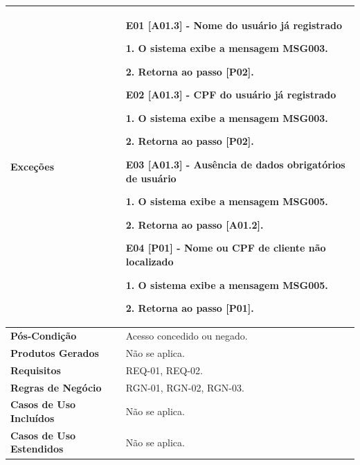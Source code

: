 \newpage
\begin{quadro}[!htbp]
	\begin{tabular}{  m{4cm}  m{11cm} }  	
        \cellcolor{gray!10}\textbf {Exceções}            & \cellcolor{gray!10}\textbf {E01 [A01.3] - Nome do usuário já registrado}
        
        1. O sistema exibe a mensagem MSG003.
        
        2. Retorna ao passo [P02].
        
        \textbf {E02 [A01.3] - CPF do usuário já registrado}
        
        1. O sistema exibe a mensagem MSG003.
        
        2. Retorna ao passo [P02].
        
        \textbf {E03 [A01.3] - Ausência de dados obrigatórios de usuário}
        
        1. O sistema exibe a mensagem MSG005.
        
        2. Retorna ao passo [A01.2].
        
        \textbf {E04 [P01] - Nome ou CPF de cliente não localizado}
        
        1. O sistema exibe a mensagem MSG005.
        
        2. Retorna ao passo [P01].  \\ \hline
	
        \textbf {Pós-Condição}        & Acesso concedido ou negado.  \\ \hline
  	
        \cellcolor{gray!10}\textbf {Produtos Gerados}    & \cellcolor{gray!10} Não se aplica.  \\ \hline
        
        \textbf {Requisitos}          & REQ-01, REQ-02.  \\ \hline
        
        \cellcolor{gray!10}\textbf {Regras de Negócio}   & \cellcolor{gray!10} RGN-01, RGN-02, RGN-03.  \\ \hline
        
        \textbf {Casos de Uso Incluídos} & Não se aplica.  \\ \hline

        \cellcolor{gray!10} \textbf {Casos de Uso Estendidos} & \cellcolor{gray!10} Não se aplica.  \\ \hline

        

\end{tabular}
\end{quadro}
